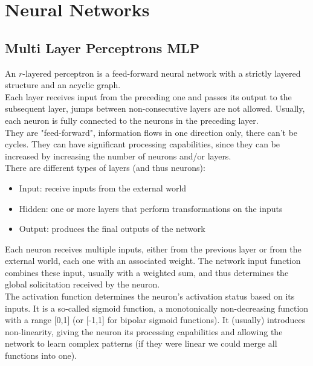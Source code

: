 \section{Neural Networks}

\subsection{Multi Layer Perceptrons MLP}

An $r$-layered perceptron is a feed-forward neural network with a strictly layered structure and an acyclic graph.\\

Each layer receives input from the preceding one and passes its output to the subsequent layer, jumps between non-consecutive layers are not allowed. Usually, each neuron is fully connected to the neurons in the preceding layer. \\

They are "feed-forward", information flows in one direction only, there can't be cycles. They can have significant processing capabilities, since they can be increased by increasing the number of neurons and/or layers.\\

There are different types of layers (and thus neurons):
\begin{itemize}
	\item Input: receive inputs from the external world
	\item Hidden: one or more layers that perform transformations on the inputs
	\item Output: produces the final outputs of the network
\end{itemize}

Each neuron receives multiple inputs, either from the previous layer or from the external world, each one with an associated weight. The network input function combines these input, usually with a weighted sum, and thus determines the global solicitation received by the neuron.\\

The activation function determines the neuron's activation status based on its inputs. It is a so-called sigmoid function, a monotonically non-decreasing function with a range [0,1] (or [-1,1] for bipolar sigmoid functions). It (usually) introduces non-linearity, giving the neuron its processing capabilities and allowing the network to learn complex patterns (if they were linear we could merge all functions into one).\\

